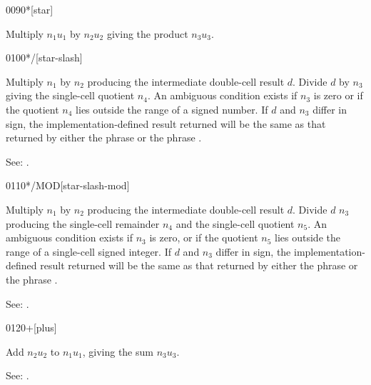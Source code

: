 \begin{newword}{0090}{*}[star]

	Multiply $n_1$\textbar$u_1$ by $n_2$\textbar$u_2$ giving the
	product $n_3$\textbar$u_3$.
\end{newword}


\begin{newword}{0100}{*/}[star-slash]

	Multiply $n_1$ by $n_2$ producing the intermediate double-cell
	result $d$. Divide $d$ by $n_3$ giving the single-cell quotient
	$n_4$. An ambiguous condition exists if $n_3$ is zero or if the
	quotient $n_4$ lies outside the range of a signed number. If $d$
	and $n_3$ differ in sign, the implementation-defined result
	returned will be the same as that returned by either the phrase
	    
	 or the phrase   
	  .

\item[See:]
	.
\end{newword}


\begin{newword}{0110}{*/MOD}[star-slash-mod]

	Multiply $n_1$ by $n_2$ producing the intermediate double-cell
	result $d$. Divide $d$ $n_3$ producing the single-cell remainder
	$n_4$ and the single-cell quotient $n_5$. An ambiguous condition
	exists if $n_3$ is zero, or if the quotient $n_5$ lies outside
	the range of a single-cell signed integer. If $d$ and $n_3$
	differ in sign, the implementation-defined result returned will
	be the same as that returned by either the phrase
	    or the phrase
	   .

\item[See:]
	.
\end{newword}


\begin{newword}{0120}{+}[plus]

	Add $n_2$\textbar$u_2$ to $n_1$\textbar$u_1$, giving the sum
	$n_3$\textbar$u_3$.

\item[See:]
	.
\end{newword}


